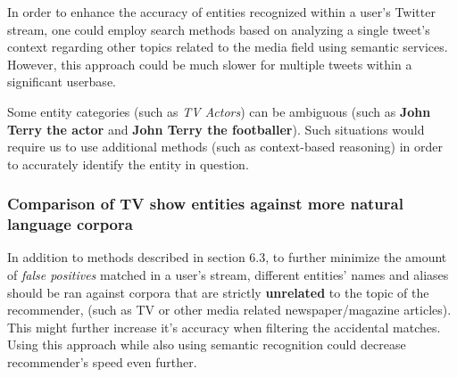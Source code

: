 In order to enhance the accuracy of entities recognized within a user's Twitter
stream, one could employ search methods based on analyzing a single tweet's
context regarding other topics related to the media field using semantic
services.  However, this approach could be much slower for multiple tweets
within a significant userbase.

Some entity categories (such as \textit{TV Actors}) can be ambiguous
(such as \textbf{John Terry the actor} and \textbf{John Terry the footballer}).
Such situations would require us to use additional methods (such as context-based
reasoning) in order to accurately identify the entity in question.

\subsubsection{Comparison of TV show entities against more natural language corpora}

In addition to methods described in section 6.3, to further minimize the amount of \textit{false positives}
matched in a user's stream, different entities' names and aliases should be ran against corpora
that are strictly \textbf{unrelated} to the topic of the recommender, (such as TV or other media related
newspaper/magazine articles). This might further increase it's accuracy when filtering the accidental
matches. Using this approach while also using semantic recognition could decrease recommender's
speed even further.
